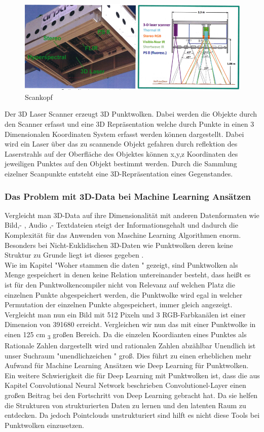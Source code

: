 \documentclass{llncs}
\begin{document}
\begin{figure}[htbp] 
	\centering
	\includegraphics[width=1.0\textwidth]{lematech_2.png}
	\caption{Scankopf}
	\label{fig:Bild14}
\end{figure}

Der 3D Laser Scanner erzeugt 3D Punktwolken. Dabei werden die Objekte durch den Scanner erfasst und eine 3D Repräsentation welche durch Punkte in einen 3 Dimensionalen Koordinaten System erfasst werden können dargestellt. Dabei wird ein Laser über das zu scannende Objekt gefahren durch reflektion des Laserstrahls auf der Oberfläche des Objektes können x,y,z Koordinaten des jeweiligen Punktes auf den Objekt bestimmt werden. Durch die Sammlung eizelner Scanpunkte entsteht eine 3D-Repräsentation eines Gegenstandes. 
\subsubsection{Das Problem mit 3D-Data bei Machine Learning Ansätzen}
Vergleicht man 3D-Data auf ihre Dimensionalität mit anderen Datenformaten wie Bild,- , Audio ,- Textdateien steigt der Informationsgehalt und dadurch die Komplexität für das Anwenden von Maschine Learning Algorithmen enorm. Besonders bei Nicht-Euklidischen 3D-Daten wie Punktwolken deren keine Struktur zu Grunde liegt ist dieses gegeben \cite{3dprob}.
\\
Wie im Kapitel "Woher stammen die daten " gezeigt, sind Punktwolken als Menge gespeichert in denen keine Relation untereinander besteht, dass heißt es ist für den Punktwolkencompiler nicht von Relevanz auf welchen Platz die einzelnen Punkte abgespeichert werden, die Punktwolke wird egal in welcher Permutation der einzelnen Punkte abgespeichert, immer gleich angezeigt. Vergleicht man nun ein Bild mit 512 Pixeln und 3 RGB-Farbkanälen ist einer Dimension von 391680 erreicht. Vergleichen wir nun das mit einer Punktwolke in einen 125 cm \textsubscript{3} großen Bereich. Da die einzelen Koordianten eines Punktes als Rationale Zahlen dargestellt wird und rationalen Zahlen abzählbar Unendlich ist unser Suchraum "unendlichzeichen " groß. Dies führt zu einen erheblichen mehr Aufwand für Machine Learning Ansätzen wie Deep Learning für Punktwolken.
\\
Ein weitere Schwierigkeit die für Deep Learning mit Punktwolken ist, dass die aus Kapitel Convolutional Neural Network beschrieben Convolutionel-Layer einen großen Beitrag bei den Fortschritt von Deep Learning gebracht hat. Da sie helfen die Strukturen von strukturierten Daten zu lernen und den latenten Raum zu entdecken. Da jedoch Pointclouds unstrukturiert sind hilft es nicht diese Tools bei Punktwolken einzusetzen\cite{3dgan}. 
\end{document}
